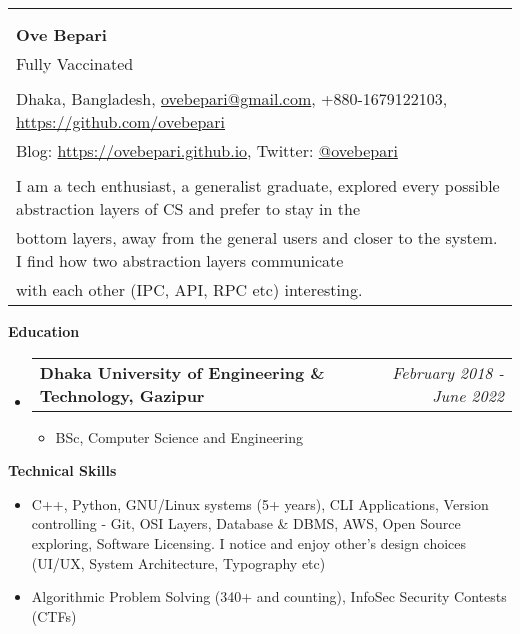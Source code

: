 \documentclass[legalpaper,10pt]{article}
\makeatletter
\newcommand{\resheading}[1]{{\large \colorbox{mygrey}{\begin{minipage}{\textwidth}{\textbf{#1 \vphantom{p\^{E}}}}\end{minipage}}}}
\newcommand{\ressubheading}[4]{
	\begin{tabular*}{7.1in}{l@{\extracolsep{\fill}}r}
		\textbf{#1} & \textit{#4} \\
	\end{tabular*}\vspace{-6pt}}
\makeatother
\begin{document}
	\begin{tabular*}{7.5in}{l@{\extracolsep{\fill}}}
		\\
		\\
		\\
		\textbf{\large Ove Bepari}\\
		{\scriptsize Fully Vaccinated}
		\\
		\\
		Dhaka, Bangladesh, \href{mailto:ovebepari@gmail.com}{ovebepari@gmail.com}, +880-1679122103, \url{https://github.com/ovebepari} \\
		 Blog: \url{https://ovebepari.github.io}, Twitter: \href{https://twitter.com/ovebepari}{@ovebepari}
		\\
		\\
		I am a tech enthusiast, a generalist graduate, explored every possible abstraction layers of CS and prefer to stay in the\\bottom layers, away from the general users and closer to the system. I find how two abstraction layers communicate\\with each other (IPC, API, RPC etc) interesting.
	\end{tabular*}
	
	\vspace{0.25in}
	
	\resheading{Education}
	\begin{itemize}
	
		\item \ressubheading{Dhaka University of Engineering \& Technology, Gazipur}{}{}{February 2018 - June 2022}
		\begin{itemize}
			\item BSc, Computer Science and Engineering
		\end{itemize}
	
	\end{itemize}
	
	\vspace{0.20in}
	
	\resheading{Technical Skills}
	\begin{itemize}
		\item C++, Python, GNU/Linux systems (5+ years), CLI Applications, Version controlling - Git, OSI Layers, Database \& DBMS, AWS, Open Source exploring, Software Licensing. I notice and enjoy other's design choices (UI/UX, System Architecture, Typography etc)
		\item Algorithmic Problem Solving (340+ and counting), InfoSec Security Contests (CTFs)
	\end{itemize}
\end{document}
